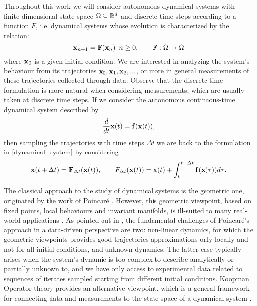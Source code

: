 Throughout this work we will consider autonomous dynamical systems with finite-dimensional state space $\Omega\subseteq\mathbb{R}^d$ and discrete time steps according to a function $F$, i.e. dynamical systems whose evolution is characterized by the relation:
\begin{equation}
    \label{dynamical_system}
    \vb{x}_{n+1} = \vb{F}(\vb{x}_n)\,\,\,n\geq 0, \qquad \vb{F}:\Omega \to \Omega
\end{equation}
where $\vb{x}_0$ is a given initial condition. We are interested in analyzing the system's behaviour from its trajectories $\vb{x}_0, \vb{x}_1, \vb{x}_2,...$, or more in general measurements of these trajectories collected through data. Observe that the discrete-time formulation is more natural when considering measurements, which are usually taken at discrete time steps. If we consider the autonomous continuous-time dynamical system described by
\begin{equation*}
    \frac{d}{dt}\vb{x}(t) = \vb{f}(\vb{x}(t)),
\end{equation*}
then sampling the trajectories with time steps $\Delta t$ we are back to the formulation in \eqref{dynamical_system} by considering
\begin{equation}
    \label{continuous_to_discrete}
    \vb{x}(t+\Delta t) = \vb{F}_{\Delta t}(\vb{x}(t)), \qquad \vb\vb{F}_{\Delta t}(\vb{x}(t)) = \vb{x}(t) + \int_{t}^{t+\Delta t}{\vb{f}(\vb{x}(\tau)) d\tau}.
\end{equation}

The classical approach to the study of dynamical systems is the geometric one, originated by the work of Poincaré \cite{henri_poincare_les_1899}. However, this geometric viewpoint, based on fixed points, local behaviours and invariant manifolds, is ill-suited to many real-world applications \cite{budisic_applied_2012}. As pointed out in \cite{colbrook_rigorous_2021}, the fundamental challenges of Poincaré's approach in a data-driven perspective are two: non-linear dynamics, for which the geometric viewpoints provides good trajectories approximations only locally and not for all initial conditions, and unknown dynamics. The latter case typically arises when the system's dynamic is too complex to describe analytically or partially unknown to, and we have only access to experimental data related to sequences of iterates sampled starting from different initial conditions. Koopman Operator theory \cite{koopman_dynamical_1932, koopman_hamiltonian_1931} provides an alternative viewpoint, which is a general framework for connecting data and measurements to the state space of a dynamical system \cite{arbabi_introduction_nodate}.

